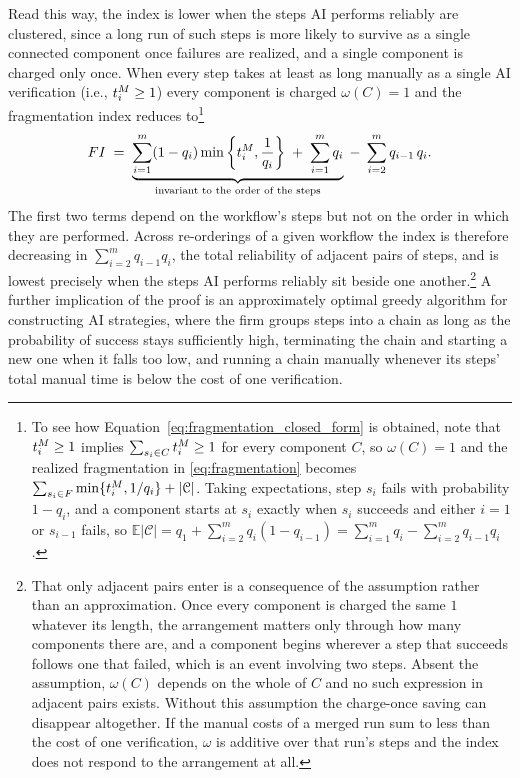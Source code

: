 Read this way, the index is lower when the steps AI performs reliably are clustered, since a long run of such steps is more likely to survive as a single connected component once failures are realized, and a single component is charged only once.
When every step takes at least as long manually as a single AI verification (i.e., $t^{M}_{i} \geq 1$) every component is charged $\omega(C) = 1$ and the fragmentation index reduces to\footnote{
To see how Equation~\ref{eq:fragmentation_closed_form} is obtained, note that $t^{M}_{i} \geq 1$ implies $\sum_{s_i \in C} t^{M}_{i} \geq 1$ for every component $C$, so $\omega(C) = 1$ and the realized fragmentation in \eqref{eq:fragmentation} becomes $\sum_{s_i \in F}\min\{t^{M}_{i}, 1/q_i\} + \lvert \mathcal{C} \rvert$.
Taking expectations, step $s_i$ fails with probability $1-q_i$, and a component starts at $s_i$ exactly when $s_i$ succeeds and either $i=1$ or $s_{i-1}$ fails, so $\mathbb{E}\lvert \mathcal{C} \rvert = q_1 + \sum_{i=2}^{m} q_i(1-q_{i-1}) = \sum_{i=1}^{m} q_i - \sum_{i=2}^{m} q_{i-1} q_i$.
}
\begin{equation}
FI \;=\; \underbrace{\sum_{i=1}^{m} (1-q_i)\min\left\{t^{M}_{i}, \frac{1}{q_i}\right\} \;+\; \sum_{i=1}^{m} q_i}_{\text{invariant to the order of the steps}} \;-\; \sum_{i=2}^{m} q_{i-1}\,q_i .
\label{eq:fragmentation_closed_form}
\end{equation}
The first two terms depend on the workflow's steps but not on the order in which they are performed.
Across re-orderings of a given workflow the index is therefore decreasing in $\sum_{i=2}^{m} q_{i-1} q_i$, the total reliability of adjacent pairs of steps, and is lowest precisely when the steps AI performs reliably sit beside one another.\footnote{That only adjacent pairs enter is a consequence of the assumption rather than an approximation. Once every component is charged the same $1$ whatever its length, the arrangement matters only through how many components there are, and a component begins wherever a step that succeeds follows one that failed, which is an event involving two steps.
Absent the assumption, $\omega(C)$ depends on the whole of $C$ and no such expression in adjacent pairs exists.
Without this assumption the charge-once saving can disappear altogether. If the manual costs of a merged run sum to less than the cost of one verification, $\omega$ is additive over that run's steps and the index does not respond to the arrangement at all.
}
A further implication of the proof is an approximately optimal greedy algorithm for constructing AI strategies, where the firm groups steps into a chain as long as the probability of success stays sufficiently high, terminating the chain and starting a new one when it falls too low, and running a chain manually whenever its steps' total manual time is below the cost of one verification.



